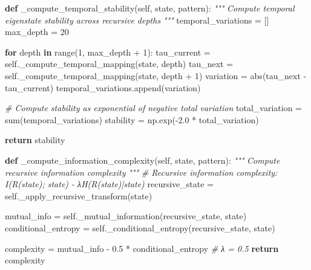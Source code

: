 \documentclass[
]{article}
\newenvironment{Shaded}{}{}
\newcommand{\BuiltInTok}[1]{\textcolor[rgb]{0.00,0.50,0.00}{#1}}
\newcommand{\CommentTok}[1]{\textcolor[rgb]{0.38,0.63,0.69}{\textit{#1}}}
\newcommand{\ControlFlowTok}[1]{\textcolor[rgb]{0.00,0.44,0.13}{\textbf{#1}}}
\newcommand{\DecValTok}[1]{\textcolor[rgb]{0.25,0.63,0.44}{#1}}
\newcommand{\FloatTok}[1]{\textcolor[rgb]{0.25,0.63,0.44}{#1}}
\newcommand{\KeywordTok}[1]{\textcolor[rgb]{0.00,0.44,0.13}{\textbf{#1}}}
\newcommand{\NormalTok}[1]{#1}
\newcommand{\OperatorTok}[1]{\textcolor[rgb]{0.40,0.40,0.40}{#1}}
\newcommand{\VariableTok}[1]{\textcolor[rgb]{0.10,0.09,0.49}{#1}}
\begin{document}
\begin{Shaded}
\begin{Highlighting}[]
    \KeywordTok{def}\NormalTok{ \_compute\_temporal\_stability(}\VariableTok{self}\NormalTok{, state, pattern):}
        \CommentTok{"""}
\CommentTok{        Compute temporal eigenstate stability across recursive depths}
\CommentTok{        """}
\NormalTok{        temporal\_variations }\OperatorTok{=}\NormalTok{ []}
\NormalTok{        max\_depth }\OperatorTok{=} \DecValTok{20}

        \ControlFlowTok{for}\NormalTok{ depth }\KeywordTok{in} \BuiltInTok{range}\NormalTok{(}\DecValTok{1}\NormalTok{, max\_depth }\OperatorTok{+} \DecValTok{1}\NormalTok{):}
\NormalTok{            tau\_current }\OperatorTok{=} \VariableTok{self}\NormalTok{.\_compute\_temporal\_mapping(state, depth)}
\NormalTok{            tau\_next }\OperatorTok{=} \VariableTok{self}\NormalTok{.\_compute\_temporal\_mapping(state, depth }\OperatorTok{+} \DecValTok{1}\NormalTok{)}
\NormalTok{            variation }\OperatorTok{=} \BuiltInTok{abs}\NormalTok{(tau\_next }\OperatorTok{{-}}\NormalTok{ tau\_current)}
\NormalTok{            temporal\_variations.append(variation)}

        \CommentTok{\# Compute stability as exponential of negative total variation}
\NormalTok{        total\_variation }\OperatorTok{=} \BuiltInTok{sum}\NormalTok{(temporal\_variations)}
\NormalTok{        stability }\OperatorTok{=}\NormalTok{ np.exp(}\OperatorTok{{-}}\FloatTok{2.0} \OperatorTok{*}\NormalTok{ total\_variation)}

        \ControlFlowTok{return}\NormalTok{ stability}

    \KeywordTok{def}\NormalTok{ \_compute\_information\_complexity(}\VariableTok{self}\NormalTok{, state, pattern):}
        \CommentTok{"""}
\CommentTok{        Compute recursive information complexity}
\CommentTok{        """}
        \CommentTok{\# Recursive information complexity: I(R(state); state) {-} λH(R(state)|state)}
\NormalTok{        recursive\_state }\OperatorTok{=} \VariableTok{self}\NormalTok{.\_apply\_recursive\_transform(state)}

\NormalTok{        mutual\_info }\OperatorTok{=} \VariableTok{self}\NormalTok{.\_mutual\_information(recursive\_state, state)}
\NormalTok{        conditional\_entropy }\OperatorTok{=} \VariableTok{self}\NormalTok{.\_conditional\_entropy(recursive\_state, state)}

\NormalTok{        complexity }\OperatorTok{=}\NormalTok{ mutual\_info }\OperatorTok{{-}} \FloatTok{0.5} \OperatorTok{*}\NormalTok{ conditional\_entropy  }\CommentTok{\# λ = 0.5}
        \ControlFlowTok{return}\NormalTok{ complexity}
\end{Highlighting}
\end{Shaded}
\end{document}
